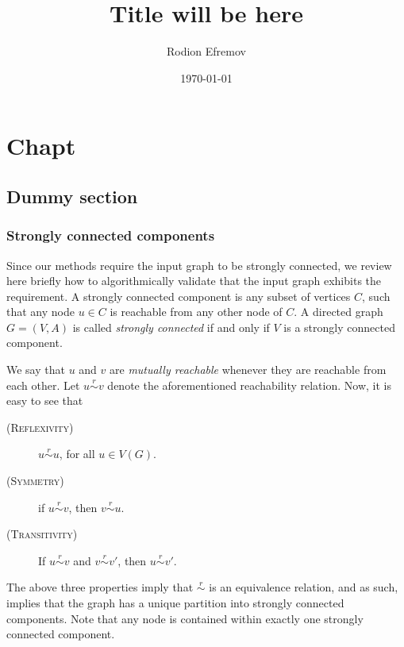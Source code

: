 \documentclass[english]{tktltiki2}
\title{Title will be here}
\author{Rodion Efremov}
\date{\today}
\theoremstyle{definition}
\theoremstyle{remark}
\begin{document}

\frontmatter      %

\maketitle        %
\makeabstract     %

\tableofcontents  %


\mainmatter       %

%
%
% 
%

\chapter{Chapt}
\section*{Dummy section}

\subsection{Strongly connected components}
Since our methods require the input graph to be strongly connected, we review here briefly how to algorithmically validate that the input graph exhibits the requirement. A strongly connected component is any subset of vertices $C$, such that any node $u \in C$ is reachable from any other node of $C$. A directed graph $G = (V, A)$ is called \textit{strongly connected} if and only if $V$ is a strongly connected component.

We say that $u$ and $v$ are \textit{mutually reachable} whenever they are reachable from each other. Let $u \overset{r}{\sim} v$ denote the aforementioned reachability relation. Now, it is easy to see that
\begin{description}
\item[\textsc{(Reflexivity)}]  $u \overset{r}{\sim} u$, for all $u \in V(G)$.
\item[\textsc{(Symmetry)}] if  $u \overset{r}{\sim} v$, then $v \overset{r}{\sim} u$.
\item[\textsc{(Transitivity)}] If $u \overset{r}{\sim} v$ and $v \overset{r}{\sim} v'$, then $u \overset{r}{\sim} v'$.
\end{description}
The above three properties imply that $\overset{r}{\sim}$ is an equivalence relation, and as such, implies that the graph has a unique partition into strongly connected components. Note that any node is contained within exactly one strongly connected component.
\end{document}
